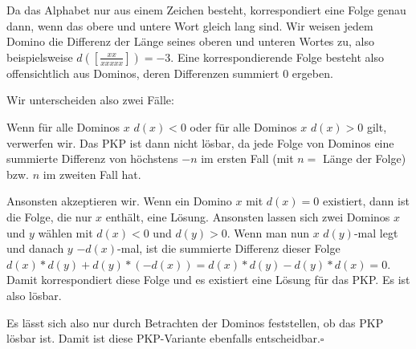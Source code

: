 Da das Alphabet nur aus einem Zeichen besteht, korrespondiert eine Folge genau
dann, wenn das obere und untere Wort gleich lang sind.
Wir weisen jedem Domino die Differenz der Länge seines oberen und unteren Wortes
zu, also beispielsweise $d(\left[\frac{xx}{xxxxx}\right]) = -3$. Eine
korrespondierende Folge besteht also offensichtlich aus Dominos, deren
Differenzen summiert 0 ergeben.

Wir unterscheiden also zwei Fälle:

Wenn für alle Dominos $x$ $d(x) < 0$ oder für alle Dominos $x$ $d(x) > 0$ gilt,
verwerfen wir. Das PKP ist dann nicht lösbar, da jede Folge von Dominos eine
summierte Differenz von höchstens $-n$ im ersten Fall (mit $n =$ Länge der
Folge) bzw. $n$ im zweiten Fall hat.

Ansonsten akzeptieren wir. Wenn ein Domino $x$ mit $d(x) = 0$ existiert, dann
ist die Folge, die nur $x$ enthält, eine Lösung. Ansonsten lassen sich zwei
Dominos $x$ und $y$ wählen mit $d(x) < 0$ und $d(y) > 0$. Wenn man nun
$x$ $d(y)$-mal legt und danach $y$ $-d(x)$-mal, ist die summierte Differenz
dieser Folge $d(x)*d(y) + d(y)*(-d(x)) = d(x)*d(y) - d(y)*d(x) = 0$. Damit
korrespondiert diese Folge und es existiert eine Lösung für das PKP. Es ist also
lösbar.

Es lässt sich also nur durch Betrachten der Dominos feststellen, ob das PKP
lösbar ist. Damit ist diese PKP-Variante ebenfalls entscheidbar.\hfill$\square$
